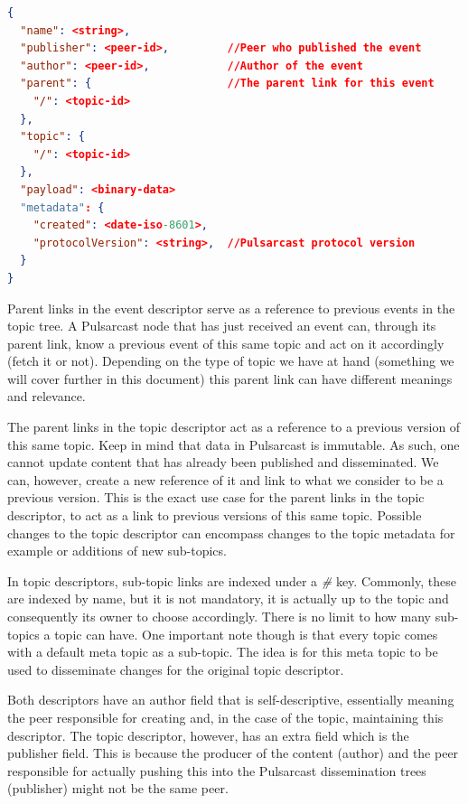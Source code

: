 \begin{lstlisting}[float, language=JSON,caption={Event descriptor schema in a JSON based format},label={event-descriptor}]
{
  "name": <string>,
  "publisher": <peer-id>,         //Peer who published the event
  "author": <peer-id>,            //Author of the event
  "parent": {                     //The parent link for this event
    "/": <topic-id>
  },
  "topic": {
    "/": <topic-id>
  },
  "payload": <binary-data>
  "metadata": {
    "created": <date-iso-8601>,
    "protocolVersion": <string>,  //Pulsarcast protocol version
  }
}
\end{lstlisting}


Parent links in the event descriptor serve as a reference to previous events in
the topic tree. A Pulsarcast node that has just received an event can, through
its parent link, know a previous event of this same topic and act on it
accordingly (fetch it or not). Depending on the type of topic we have at hand
(something we will cover further in this document) this parent link can have
different meanings and relevance.

The parent links in the topic descriptor act as a reference to a previous
version of this same topic. Keep in mind that data in Pulsarcast is immutable.
As such, one cannot update content that has already been published and
disseminated. We can, however, create a new reference of it and link to what we
consider to be a previous version. This is the exact use case for the parent
links in the topic descriptor, to act as a link to previous versions of this
same topic. Possible changes to the topic descriptor can encompass changes to
the topic metadata for example or additions of new sub-topics.

In topic descriptors, sub-topic links are indexed under a \emph{\#} key.
Commonly, these are indexed by name, but it is not mandatory, it is actually up
to the topic and consequently its owner to choose accordingly.  There is no
limit to how many sub-topics a topic can have. One important note though is
that every topic comes with a default meta topic as a sub-topic. The idea is
for this meta topic to be used to disseminate changes for the original topic
descriptor.

Both descriptors have an author field that is self-descriptive, essentially
meaning the peer responsible for creating and, in the case of the topic,
maintaining this descriptor. The topic descriptor, however, has an extra field
which is the publisher field. This is because the producer of the content
(author) and the peer responsible for actually pushing this into the Pulsarcast
dissemination trees (publisher) might not be the same peer.

